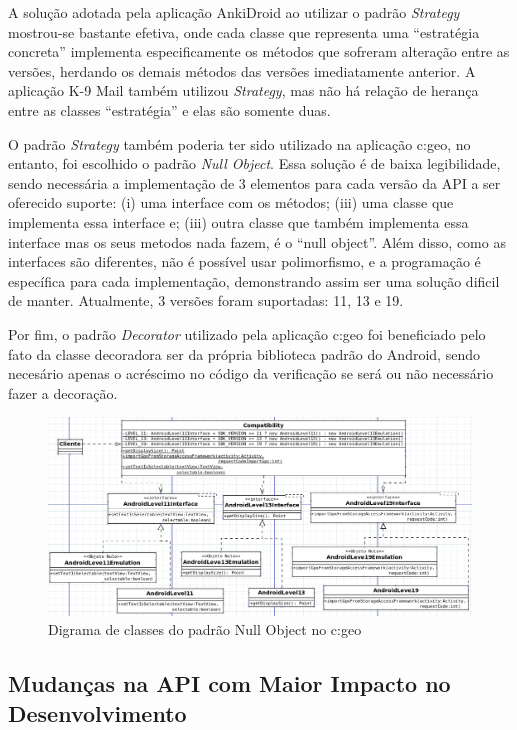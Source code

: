 A solução adotada pela aplicação AnkiDroid ao utilizar o padrão \textit{Strategy}
mostrou-se bastante efetiva, onde cada classe  que representa uma “estratégia concreta”
implementa especificamente os métodos que sofreram alteração entre as versões,
herdando os demais métodos das versões imediatamente anterior.
A aplicação K-9 Mail também utilizou \textit{Strategy}, mas não há relação de
herança entre as classes “estratégia” e elas são somente duas.

O padrão \textit{Strategy} também poderia ter sido utilizado na aplicação c:geo,
no entanto, foi escolhido o padrão \textit{Null Object}. Essa solução é de baixa
legibilidade, sendo necessária a implementação de 3 elementos para cada versão da
API a ser oferecido suporte: (i) uma interface com os métodos; (iii) uma classe
que implementa essa interface e; (iii) outra classe que também implementa essa interface
mas os seus metodos nada fazem, é o “null object”.
Além disso, como as interfaces são diferentes, não é possível usar polimorfismo,
e a programação é específica para cada implementação, demonstrando assim ser uma
solução dificil de manter. Atualmente, 3 versões foram suportadas: 11, 13 e 19.

Por fim, o padrão \textit{Decorator} utilizado pela aplicação c:geo foi beneficiado
pelo fato da classe decoradora ser da própria biblioteca padrão do Android,
sendo necesário apenas o acréscimo no código da verificação se será ou não
necessário fazer a decoração.

\begin{figure}[H]
\centering
\includegraphics[scale=0.6, angle=90]{imagens/null_object.png}
\caption{Digrama de classes do padrão Null Object no c:geo}
\label{fig:null_object}
\end{figure}


\subsection{Mudanças na API com Maior Impacto no Desenvolvimento}
\label{sec:mudancas}

